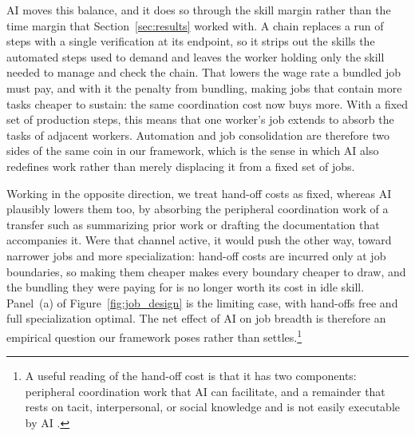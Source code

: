 AI moves this balance, and it does so through the skill margin rather than the time margin that Section~\ref{sec:results} worked with.
A chain replaces a run of steps with a single verification at its endpoint, so it strips out the skills the automated steps used to demand and leaves the worker holding only the skill needed to manage and check the chain.
That lowers the wage rate a bundled job must pay, and with it the penalty from bundling, making jobs that contain more tasks cheaper to sustain: the same coordination cost now buys more.
With a fixed set of production steps, this means that one worker's job extends to absorb the tasks of adjacent workers.
Automation and job consolidation are therefore two sides of the same coin in our framework, which is the sense in which AI also redefines work rather than merely displacing it from a fixed set of jobs.

Working in the opposite direction, we treat hand-off costs as fixed, whereas AI plausibly lowers them too, by absorbing the peripheral coordination work of a transfer such as summarizing prior work or drafting the documentation that accompanies it.
Were that channel active, it would push the other way, toward narrower jobs and more specialization: hand-off costs are incurred only at job boundaries, so making them cheaper makes every boundary cheaper to draw, and the bundling they were paying for is no longer worth its cost in idle skill.
Panel~(a) of Figure~\ref{fig:job_design} is the limiting case, with hand-offs free and full specialization optimal.
The net effect of AI on job breadth is therefore an empirical question our framework poses rather than settles.\footnote{
A useful reading of the hand-off cost is that it has two components: peripheral coordination work that AI can facilitate, and a remainder that rests on tacit, interpersonal, or social knowledge and is not easily executable by AI \citep{deming2017growing}.
}